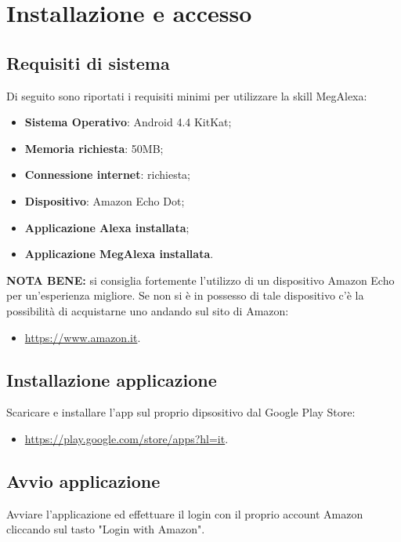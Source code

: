 \chapter{Installazione e accesso}
\label{Installazione}

\section{Requisiti di sistema}
Di seguito sono riportati i requisiti minimi per utilizzare la skill MegAlexa:

\begin{itemize}
	\item \textbf{Sistema Operativo}: Android 4.4 KitKat;
	\item \textbf{Memoria richiesta}: 50MB;
	\item \textbf{Connessione internet}: richiesta;
	\item \textbf{Dispositivo}: Amazon Echo Dot;
	\item \textbf{Applicazione Alexa installata};
	\item \textbf{Applicazione MegAlexa installata}.
	
	
\end{itemize}

\textbf{NOTA BENE:} si consiglia fortemente l'utilizzo di un dispositivo Amazon Echo per un'esperienza migliore. Se non si è in possesso di tale dispositivo c'è la possibilità di acquistarne uno andando sul sito di Amazon:
\begin{itemize}
	\item \url{https://www.amazon.it}.
\end{itemize}

\section{Installazione applicazione}
Scaricare e installare l'app sul proprio dipsositivo dal Google Play Store:
\begin{itemize}
	\item \url{https://play.google.com/store/apps?hl=it}.
\end{itemize}
\newpage
\section{Avvio applicazione}

Avviare l'applicazione ed effettuare il login con il proprio account Amazon cliccando sul tasto "Login with Amazon".

